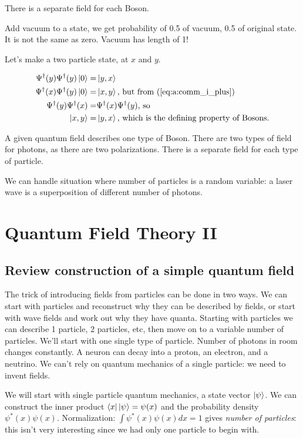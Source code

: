 \documentclass[]{article}
\begin{document}
There is a separate field for each Boson.

Add vacuum to a state, we get probability of 0.5 of vacuum, 0.5 of original state. It is not the same as zero. Vacuum has length of 1!

Let's make a two particle state, at $x$ and $y$. 
 
\begin{align*}
	\Psi^\dagger(y)\Psi^\dagger(y)\ket{0} =& \ket{y,x}\\
	\Psi^\dagger(x)\Psi^\dagger(y)\ket{0} =& \ket{x,y} \text{, but from (\ref {eq:a:comm_i_plus})}\\
	\Psi^\dagger(y)\Psi^\dagger(x) =& \Psi^\dagger(x)\Psi^\dagger(y) \text{, so}\\
	\ket{x,y} =& \ket{y,x} \text{, which is the defining property of Bosons.} 
\end{align*}

A given quantum field describes one type of Boson. There are two types of field for photons, as there are two polarizations. There is a separate field for each type of particle.

We can handle situation where number of particles is a random variable: a laser wave is a superposition of different number of photons.

\section{Quantum Field Theory II}

\subsection{Review construction of a simple quantum field}

The trick of introducing fields from particles can be done in two ways. We can start with particles and reconstruct why they can be described by fields, or start with wave fields and work out why they have quanta. Starting with particles we can describe 1 particle, 2 particles, etc, then move on to a variable number of particles. We'll start with one single type of particle. Number of photons in room changes constantly. A neuron can decay into a proton, an electron, and a neutrino. We can't rely on quantum mechanics of a single particle: we need to invent fields.

We will start with single particle quantum mechanics, a state vector $\ket{\psi}$. We can construct the inner product $\bra{x}\ket{\psi}=\psi(x)$ and the probability density $\psi^*(x) \psi(x)$.  Normalization: $\int \psi^*(x) \psi(x) dx=1$ gives \textit{number of particles}: this isn't very interesting since we had only one particle to begin with.
\end{document}
